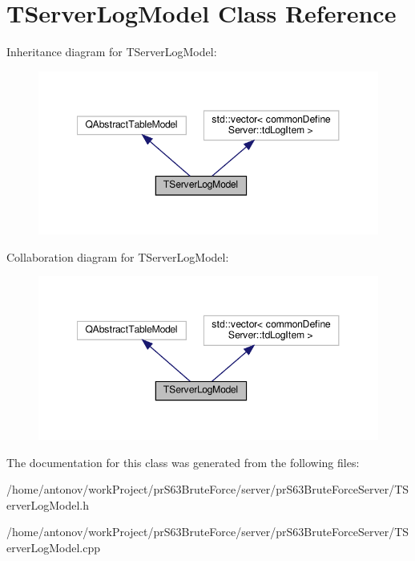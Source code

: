 \hypertarget{class_t_server_log_model}{}\section{T\+Server\+Log\+Model Class Reference}
\label{class_t_server_log_model}


Inheritance diagram for T\+Server\+Log\+Model\+:
\nopagebreak
\begin{figure}[H]
\begin{center}
\leavevmode
\includegraphics[width=348pt]{class_t_server_log_model__inherit__graph}
\end{center}
\end{figure}


Collaboration diagram for T\+Server\+Log\+Model\+:
\nopagebreak
\begin{figure}[H]
\begin{center}
\leavevmode
\includegraphics[width=348pt]{class_t_server_log_model__coll__graph}
\end{center}
\end{figure}


The documentation for this class was generated from the following files\+:\begin{DoxyCompactItemize}
\item 
/home/antonov/work\+Project/pr\+S63\+Brute\+Force/server/pr\+S63\+Brute\+Force\+Server/T\+Server\+Log\+Model.\+h\item 
/home/antonov/work\+Project/pr\+S63\+Brute\+Force/server/pr\+S63\+Brute\+Force\+Server/T\+Server\+Log\+Model.\+cpp\end{DoxyCompactItemize}
